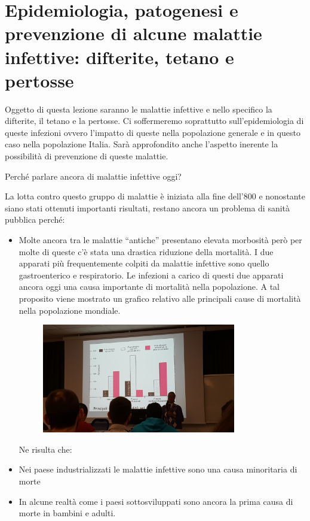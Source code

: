 \section{Epidemiologia, patogenesi e prevenzione di alcune malattie infettive: difterite, tetano e pertosse}

Oggetto di questa lezione saranno le malattie infettive e nello
specifico la difterite, il tetano e la pertosse. Ci soffermeremo
soprattutto sull'epidemiologia di queste infezioni ovvero l'impatto di
queste nella popolazione generale e in questo caso nella popolazione
Italia. Sarà approfondito anche l'aspetto inerente la possibilità di
prevenzione di queste malattie.

Perché parlare ancora di malattie infettive oggi?

La lotta contro questo gruppo di malattie è iniziata alla fine dell'800
e nonostante siano stati ottenuti importanti risultati, restano ancora
un problema di sanità pubblica perché:

\begin{itemize}
\item
  Molte ancora tra le malattie ``antiche'' presentano elevata morbosità
  però per molte di queste c'è stata una drastica riduzione della
  mortalità. I due apparati più frequentemente colpiti da malattie
  infettive sono quello gastroenterico e respiratorio. Le infezioni a
  carico di questi due apparati ancora oggi una causa importante di
  mortalità nella popolazione. A tal proposito viene mostrato un grafico
  relativo alle principali cause di mortalità nella popolazione
  mondiale.

\begin{figure}[!ht]
\centering
	\includegraphics[width=0.8\textwidth]{06/image1.jpeg}
	\end{figure}

  Ne risulta che:
\end{itemize}

\begin{itemize}
\item
  Nei paese industrializzati le malattie infettive sono una causa
  minoritaria di morte
\item
  In alcune realtà come i paesi sottosviluppati sono ancora la prima
  causa di morte in bambini e adulti.
\end{itemize}

